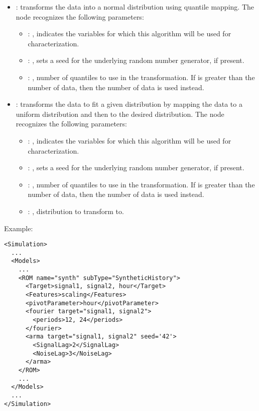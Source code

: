 \begin{itemize}
    \item {}:
      transforms the data into a normal distribution using quantile mapping.
      The  node recognizes the following parameters:
        \begin{itemize}
          \item {}: , 
            indicates the variables for which this algorithm will be used for characterization.
          \item {}: , 
            sets a seed for the underlying random number generator, if present.
          \item {}: , 
            number of quantiles to use in the transformation. If 
            is greater than the number of data, then the number of data is used instead. 
      \end{itemize}

    \item {}:
      transforms the data to fit a given distribution by mapping the data to     a uniform
      distribution and then to the desired distribution.
      The  node recognizes the following parameters:
        \begin{itemize}
          \item {}: , 
            indicates the variables for which this algorithm will be used for characterization.
          \item {}: , 
            sets a seed for the underlying random number generator, if present.
          \item {}: , 
            number of quantiles to use in the transformation. If 
            is greater than the number of data, then the number of data is used instead. 
          \item {}: , 
            distribution to transform to. 
      \end{itemize}
  \end{itemize}

\hspace{24pt}
Example:
\begin{lstlisting}[style=XML,morekeywords={name,subType,pivotLength,shift,target,threshold,period,width}]
<Simulation>
  ...
  <Models>
    ...
    <ROM name="synth" subType="SyntheticHistory">
      <Target>signal1, signal2, hour</Target>
      <Features>scaling</Features>
      <pivotParameter>hour</pivotParameter>
      <fourier target="signal1, signal2">
        <periods>12, 24</periods>
      </fourier>
      <arma target="signal1, signal2" seed='42'>
        <SignalLag>2</SignalLag>
        <NoiseLag>3</NoiseLag>
      </arma>
    </ROM>
    ...
  </Models>
  ...
</Simulation>
\end{lstlisting}


